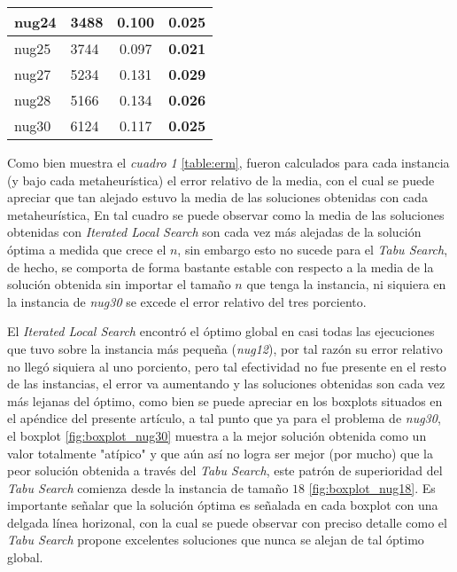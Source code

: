 \documentclass{ci5652}
\begin{document}
\begin{table}[ht]
\begin{tabular}{ll|c|c|}
  \multicolumn{1}{|l|}{nug24}              & 3488                              & 0.100                       & \textbf{0.025}             \\ \hline
  \multicolumn{1}{|l|}{nug25}              & 3744                              & 0.097                       & \textbf{0.021}             \\ \hline
  \multicolumn{1}{|l|}{nug27}              & 5234                              & 0.131                       & \textbf{0.029}             \\ \hline
  \multicolumn{1}{|l|}{nug28}              & 5166                              & 0.134                       & \textbf{0.026}             \\ \hline
  \multicolumn{1}{|l|}{nug30}              & 6124                              & 0.117                       & \textbf{0.025}             \\ \hline
    \end{tabular}
\end{table}

Como bien muestra el \textit{cuadro 1} \ref{table:erm}, fueron calculados para cada instancia (y bajo cada metaheurística) el error relativo de la media, con el cual se puede apreciar que tan alejado estuvo la media de las soluciones obtenidas con cada metaheurística, En tal cuadro se puede observar como la media de las soluciones obtenidas con \textit{Iterated Local Search} son cada vez más alejadas de la solución óptima a medida que crece el \(n\), sin embargo esto no sucede para el \textit{Tabu Search}, de hecho, se comporta de forma bastante estable con respecto a la media de la solución obtenida sin importar el tamaño \(n\) que tenga la instancia, ni siquiera en la instancia de \textit{nug30} se excede el error relativo del tres porciento. 

El \textit{Iterated Local Search} encontró el óptimo global en casi todas las ejecuciones que tuvo sobre la instancia más pequeña (\textit{nug12}), por tal razón su error relativo no llegó siquiera al uno porciento, pero tal efectividad no fue presente en el resto de las instancias, el error va aumentando y las soluciones obtenidas son cada vez más lejanas del óptimo, como bien se puede apreciar en los boxplots situados en el apéndice del presente artículo, a tal punto que ya para el problema de \textit{nug30}, el boxplot \ref{fig:boxplot_nug30} muestra a la mejor solución obtenida como un valor totalmente "atípico" y que aún así no logra ser mejor (por mucho) que la peor solución obtenida a través del \textit{Tabu Search}, este patrón de superioridad del \textit{Tabu Search} comienza desde la instancia de tamaño \(18\) \ref{fig:boxplot_nug18}. Es importante señalar que la solución óptima es señalada en cada boxplot con una delgada línea horizonal, con la cual se puede observar con preciso detalle como el \textit{Tabu Search} propone excelentes soluciones que nunca se alejan de tal óptimo global.
\end{document}

